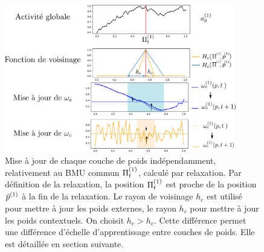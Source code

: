 \begin{figure}
\centering
\includegraphics[width=0.9\textwidth]{maj_2som.pdf}
\caption{Mise à jour de chaque couche de poids indépendamment, relativement au BMU commun $\Pi^{({1})}_t$, calculé par relaxation. Par définition de la relaxation, la position $\Pi^{({1})}_t$ est proche de la position $\hat{p}^{({1})}$ à la fin de la relaxation. Le rayon de voisinage $h_e$ est utilisé pour mettre à jour les poids externes, le rayon $h_c$ pour mettre à jour les poids contextuels. On choisit $h_e > h_c$. Cette différence permet une différence d'échelle d'apprentissage entre couches de poids. Elle est détaillée en section suivante.\label{fig:maj}}
\end{figure}

